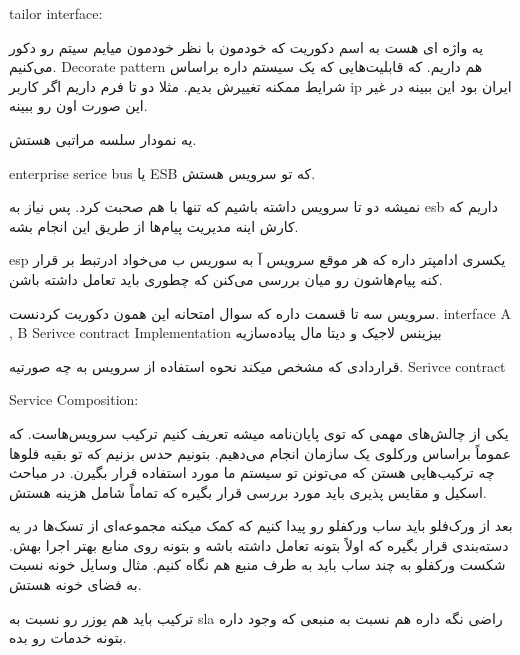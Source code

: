 
tailor interface:

یه واژه ای هست به اسم دکوریت که خودمون با نظر خودمون میایم سیتم رو دکور می‌کنیم.
Decorate pattern هم داریم. که قابلیت‌هایی که یک سیستم داره براساس شرایط ممکنه
تغییرش بدیم. مثلا دو تا فرم داریم اگر کاربر ip ایران بود این ببینه در غیر این
صورت اون رو ببینه.

یه نمودار سلسه مراتبی هستش.

enterprise serice bus یا ESB که تو سرویس هستش.

نمیشه دو تا سرویس داشته باشیم که تنها با هم صحبت کرد. پس نیاز به esb داریم که
کارش اینه مدیریت پیام‌ها از طریق این انجام بشه.

esp یکسری ادامپتر داره که هر موقع سرویس آ به سوریس ب می‌خواد ادرتبط بر قرار کنه
پیام‌هاشون رو میان بررسی می‌کنن که چطوری باید تعامل داشته باشن.


سرویس سه تا قسمت داره که سوال امتحانه
این همون دکوریت کردنست.
interface A , B  Serivce contract Implementation
بیزینس لاجیک و دیتا مال پیاده‌سازیه

قراردادی که مشخص میکند نحوه استفاده از سرویس به چه صورتیه. Serivce contract

Service Composition:

یکی از چالش‌های مهمی که توی پایان‌نامه میشه تعریف کنیم ترکیب سرویس‌هاست. که
عموماً براساس ورکلوی یک سازمان انجام می‌دهیم. بتونیم حدس بزنیم که تو بقیه فلوها
چه ترکیب‌هایی هستن که می‌تونن تو سیستم ما مورد استفاده قرار بگیرن. در مباحث
اسکیل و مقایس پذیری باید مورد بررسی قرار بگیره که تماماً شامل هزینه هستش.

بعد از ورک‌فلو باید ساب ورکفلو رو پیدا کنیم که کمک میکنه مجموعه‌ای از تسک‌ها در
یه دسته‌بندی قرار بگیره که اولاً بتونه تعامل داشته باشه و بتونه روی منابع بهتر
اجرا بهش. شکست ورکفلو به چند ساب باید به طرف منبع هم نگاه کنیم. مثال وسایل خونه
نسبت به فضای خونه هستش.

ترکیب باید هم یوزر رو نسبت به sla راضی نگه داره هم نسبت به منبعی که وجود داره
بتونه خدمات رو بده.

